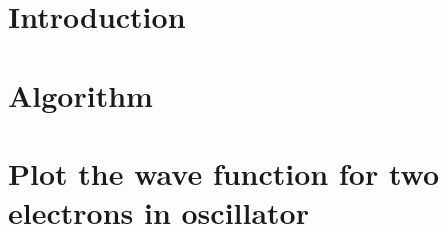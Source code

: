 \documentclass[a4paper,english]{article}
\author{Kristoffer Brækken, Vedad Hodzic, Paul Magnus
Sørensen-Clark}
\begin{document}
\begin{titlepage}
    \thispagestyle{empty}
    
\end{titlepage}

\section{Introduction}


\section{Algorithm}


\section{Plot the wave function for two electrons in oscillator}

\end{document}
